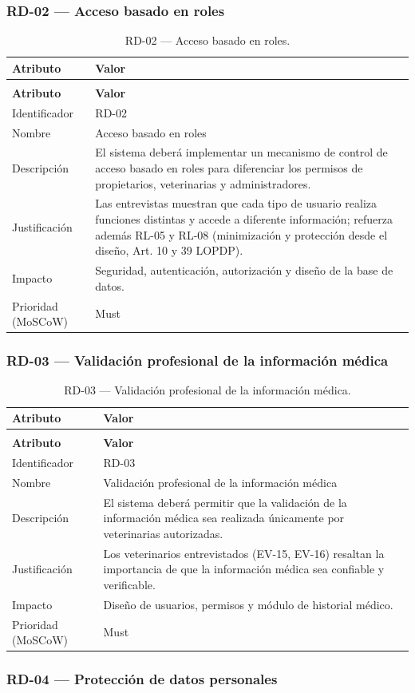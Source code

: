 \documentclass[journal,onecolumn]{IEEEtran}
\makeatletter
\newenvironment{atributos}[2]{%
	\small
	\begin{longtable}{@{}>{\raggedright\arraybackslash}p{4.2cm} >{\raggedright\arraybackslash}p{11.2cm}@{}}
		\caption{#2}\label{tab:#1}\\
		\toprule
		\textbf{Atributo} & \textbf{Valor} \\
		\midrule
		\endfirsthead
		\multicolumn{2}{@{}l}{\small\itshape (continuación)}\\
		\toprule
		\textbf{Atributo} & \textbf{Valor} \\
		\midrule
		\endhead
		\bottomrule
		\endlastfoot
	}{%
	\end{longtable}
	\normalsize
}
\makeatother
\begin{document}
	\subsubsection{RD-02 --- Acceso basado en roles}
	
	\begin{atributos}{RD-02}{RD-02 --- Acceso basado en roles.}
		Identificador & RD-02 \\
		Nombre & Acceso basado en roles \\
		Descripción & El sistema deberá implementar un mecanismo de control de acceso basado en roles para diferenciar los permisos de propietarios, veterinarias y administradores. \\
		Justificación & Las entrevistas muestran que cada tipo de usuario realiza funciones distintas y accede a diferente información; refuerza además RL-05 y RL-08 (minimización y protección desde el diseño, Art. 10 y 39 LOPDP). \\
		Impacto & Seguridad, autenticación, autorización y diseño de la base de datos. \\
		Prioridad (MoSCoW) & Must \\
	\end{atributos}
	
	\subsubsection{RD-03 --- Validación profesional de la información médica}
	
	\begin{atributos}{RD-03}{RD-03 --- Validación profesional de la información médica.}
		Identificador & RD-03 \\
		Nombre & Validación profesional de la información médica \\
		Descripción & El sistema deberá permitir que la validación de la información médica sea realizada únicamente por veterinarias autorizadas. \\
		Justificación & Los veterinarios entrevistados (EV-15, EV-16) resaltan la importancia de que la información médica sea confiable y verificable. \\
		Impacto & Diseño de usuarios, permisos y módulo de historial médico. \\
		Prioridad (MoSCoW) & Must \\
	\end{atributos}
	
	\subsubsection{RD-04 --- Protección de datos personales}
	
\end{document}
